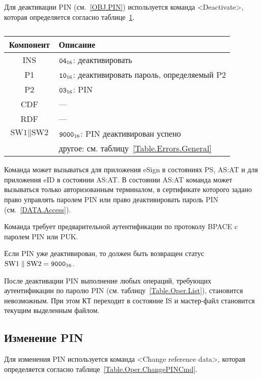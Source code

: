Для деактивации PIN (см.~\ref{OBJ.PIN}) 
используется команда <Deactivate>, 
которая определяется согласно 
таблице~\ref{Table.Oper.DeactivatePINCmd}.

\begin{table}[hbt]
\caption{}\label{Table.Oper.DeactivatePINCmd}
\begin{tabular}{|c|p{14cm}|}
\hline
Компонент & Описание \\
\hline
\hline
INS & $\texttt{04}_{16}$: деактивировать \\
\hline
P1 & $\texttt{10}_{16}$: деактивировать пароль, определяемый P2\\
\hline
P2 & $\texttt{03}_{16}$: PIN \\
\hline
CDF &  --- \\
\hline 
RDF & --- \\
\hline
$\text{SW1} \parallel \text{SW2}$ & 
$\texttt{9000}_{16}$: PIN деактивирован успено \\
  & другое: см. таблицу~\ref{Table.Errors.General}\\
\hline
\end{tabular}
\end{table}

Команда может вызываться для приложения eSign в состояниях 
PS, AS:AT и для приложения eID в состоянии AS:AT. 
В состоянии AS:AT команда может вызываться 
только авторизованным терминалом,
в сертификате которого задано право 
управлять паролем PIN или право деактивировать 
пароль PIN (см.~\ref{DATA.Access}).

Команда требует предварительной аутентификации по 
протоколу BPACE c паролем PIN или PUK. 

Если PIN уже деактивирован, то должен быть возвращен 
статус $\text{SW1} \parallel \text{SW2} = \texttt{9000}_{16}$.

После деактивации PIN выполнение любых операций, 
требующих аутентификации по паролю PIN (см. таблицу~\ref{Table.Oper.List}), 
становится невозможным. 
При этом КТ переходит в состояние IS и мастер-файл 
становится текущим выделенным файлом. 


\subsection{Изменение PIN}
\label{Oper.Descr.ChangePIN}

Для изменения PIN используется команда <Change reference data>,
которая определяется согласно 
таблице~\ref{Table.Oper.ChangePINCmd}.

